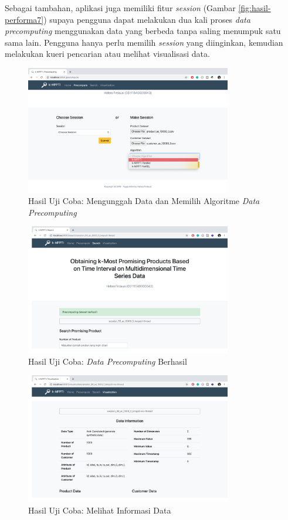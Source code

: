 Sebagai tambahan, aplikasi juga memiliki fitur \textit{session} (Gambar \ref{fig:hasil-performa7}) supaya pengguna dapat melakukan dua kali proses \textit{data precomputing} menggunakan data yang berbeda tanpa saling menumpuk satu sama lain. Pengguna hanya perlu memilih \textit{session} yang diinginkan, kemudian melakukan kueri pencarian atau melihat visualisasi data. \\

\begin{figure}[H]
	\centering
	\includegraphics[width=9cm]{assets/img/bab4/hasil2.png}
	\caption{Hasil Uji Coba: Mengunggah Data dan Memilih Algoritme \textit{Data Precomputing}}
	\label{fig:hasil-performa1}
\end{figure}

\begin{figure}[H]
	\centering
	\includegraphics[width=9cm]{assets/img/bab4/hasil1.png}
	\caption{Hasil Uji Coba: \textit{Data Precomputing} Berhasil}
	\label{fig:hasil-performa2}
\end{figure}

\begin{figure}[H]
	\centering
	\includegraphics[width=9cm]{assets/img/bab4/hasil3.png}
	\caption{Hasil Uji Coba: Melihat Informasi Data}
	\label{fig:hasil-performa3}
\end{figure}

